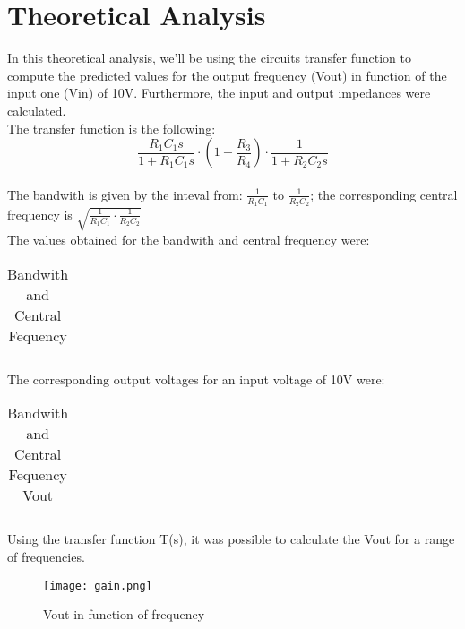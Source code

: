 \section{Theoretical Analysis}
\label{sec:analysis}

In this theoretical analysis, we'll be using the circuits transfer function to compute the predicted values for the output frequency (Vout) in function of the input one (Vin) of 10V. Furthermore, the input and output impedances were calculated.\\
The transfer function is the following: \[\frac{R_1C_1s}{1+R_1C_1s} \cdot (1+\frac{R_3}{R_4}) \cdot \frac{1}{1+R_2C_2s}\] \\
The bandwith is given by the inteval from: $\frac{1}{R_1C_1}$ to $\frac{1}{R_2C_2}$; the corresponding central frequency is $\sqrt{{\frac{1}{R_1C_1} \cdot \frac{1}{R_2C_2}}}$ \\
The values obtained for the bandwith and central frequency were:
\FloatBarrier
\begin{table}[h]
  \centering
  \begin{tabular}{|c|c|}
    \hline    
    
    \hline
  \end{tabular}
  \caption{Bandwith and Central Fequency}
  \label{tab:Octave_cent}
\end{table}
\FloatBarrier

The corresponding output voltages for an input voltage of 10V were:
\FloatBarrier
\begin{table}[h]
  \centering
  \begin{tabular}{|c|c|}
    \hline    
    
    \hline
  \end{tabular}
  \caption{Bandwith and Central Fequency Vout}
  \label{tab:Octave_cent}
\end{table}
\FloatBarrier

Using the transfer function T(s), it was possible to calculate the Vout for a range of frequencies.

\begin{figure} [!htb] 
  \texttt{[image: gain.png]}
  \caption{Vout in function of frequency} 
  \label{fig:theoplots}
  \endminipage\hfill
\end{figure}

\FloatBarrier




